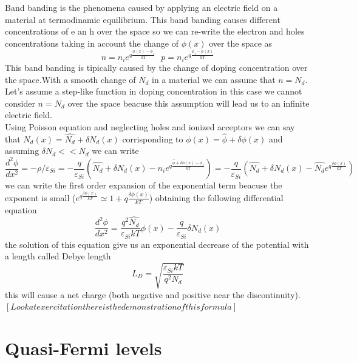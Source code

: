Band banding is the phenomena caused by applying an electric field on a material at termodinamic equilibrium. This band banding causes different concentrations of e an h over the space so we can re-write the electron and holes concentrations taking in account the change of $\phi(x)$ over the space as
\begin{equation}
n=n_ie^{q\frac{\phi(x)-\phi_f}{kT}} \ \ \ p=n_ie^{q\frac{\phi_f-\phi(x)}{kT}}
\end{equation}
This band banding is tipically caused by the change of doping concentration over the space.With a smooth change of $N_d$ in a material we can assume that $n=N_d$.\\
Let's assume a step-like function in doping concentration in this case we cannot consider $n=N_d$ over the space beacuse this assumption will lead us to an infinite electric field.\\ 
Using Poisson equation and neglecting holes and ionized acceptors we can say that $N_d(x)=\hat{N_d}+\delta N_d(x)$ corrisponding to $\phi(x)=\hat{\phi}+\delta \phi(x)$ and assuming $\delta N_d<<N_d $ we can write
\begin{equation}
\frac{d^2\phi}{dx^2}=-\rho/\varepsilon_{Si}=-\frac{q}{\varepsilon_{Si}}(\hat{N_d}+\delta N_d(x)-n_ie^{q\frac{\hat{\phi}+\delta\phi(x)-\phi_f}{kT}})=-\frac{q}{\varepsilon_{Si}}(\hat{N_d}+\delta N_d(x)-\hat{N_d}e^{q\frac{\delta\phi(x)}{kT}})
\end{equation}  
we can write the first order expansion of the exponential term beacuse the exponent is small ($e^{q\frac{\delta\phi(x)}{kT}}\simeq 1+q\frac{\delta\phi(x)}{kT} $) obtaining the following differential equation
\begin{equation}
\frac{d^2\phi}{dx^2}=\frac{q^2\hat{N_d}}{\varepsilon_{Si}kT}\phi(x)-\frac{q}{\varepsilon_{Si}}\delta N_d(x)
\end{equation}
the solution of this equation give us an exponential decrease of the potential with a length called Debye length
\begin{equation}
L_D=\sqrt{\frac{\varepsilon_{Si}kT}{q^2N_d}}
\end{equation}
this will cause a net charge (both negative and positive near the discontinuity).\\
$[Look at exercitation there is the demonstration of this formula]$
\section{Quasi-Fermi levels}

